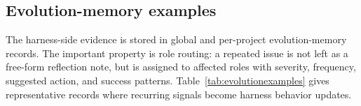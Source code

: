 \documentclass{article}
\begin{document}
\subsection{Evolution-memory examples}

The harness-side evidence is stored in global and per-project evolution-memory records. The important property is role routing: a repeated issue is not left as a free-form reflection note, but is assigned to affected roles with severity, frequency, suggested action, and success patterns. Table~\ref{tab:evolutionexamples} gives representative records where recurring signals become harness behavior updates.

\begin{table}[ht]
  \centering
    \vspace{6pt}
  \scriptsize
  

\end{table}
\end{document}
